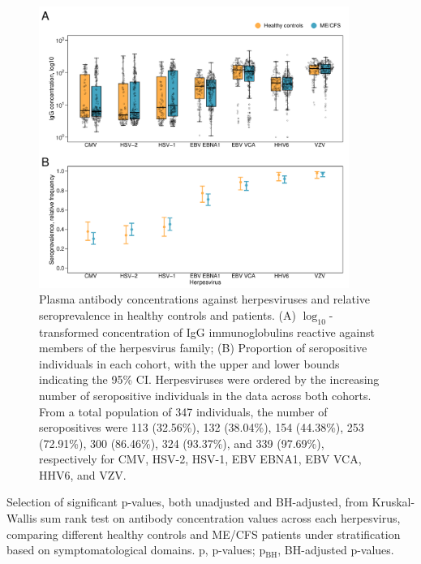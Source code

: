 \begin{figure}[htbp]
    \centering
    \includegraphics[width=0.9\textwidth]{chapter/2024-sym-domains/figures/fig5-hc-vs-cfs.pdf}
    \caption[Plasma antibody concentrations against herpesviruses and relative seroprevalence in healthy controls and \cfs patients]{Plasma antibody concentrations against herpesviruses and relative seroprevalence in healthy controls and \cfs patients. (A) ${\log_{10}}$-transformed concentration of IgG immunoglobulins reactive against members of the herpesvirus family; (B) Proportion of seropositive individuals in each cohort, with the upper and lower bounds indicating the 95\% CI. Herpesviruses were ordered by the increasing number of seropositive individuals in the data across both cohorts. From a total population of 347 individuals, the number of seropositives were 113 (32.56\%), 132 (38.04\%), 154 (44.38\%), 253 (72.91\%), 300 (86.46\%), 324 (93.37\%), and 339 (97.69\%), respectively for CMV, HSV-2, HSV-1, EBV EBNA1, EBV VCA, HHV6, and VZV.}
    \label{fig:fig5-hc-vs-cfs}
\end{figure}

\begin{table}[h]
    \centering
    \caption[Selection of significant p-values, both unadjusted and BH-adjusted, from Kruskal-Wallis sum rank test on antibody concentration values across each herpesvirus, comparing different healthy controls and ME/CFS patients under stratification based on symptomatological domains]{Selection of significant p-values, both unadjusted and BH-adjusted, from Kruskal-Wallis sum rank test on antibody concentration values across each herpesvirus, comparing different healthy controls and ME/CFS patients under stratification based on symptomatological domains. p, p-values; p$_{\text{BH}}$, BH-adjusted p-values.}
    \resizebox{\linewidth}{!}{}
    \label{tab:tab2-serology-pvalues-yhc}
\end{table}


